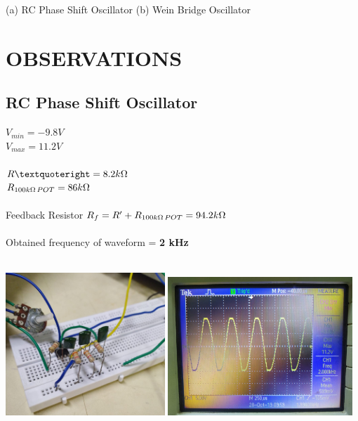 \documentclass[12pt]{report}
\begin{document}
\begin{center}
    \large (a) RC Phase Shift Oscillator\hspace{3cm} (b) Wein Bridge Oscillator
\end{center}

\chapter{OBSERVATIONS}
\label{cap:name2}

\section{RC Phase Shift Oscillator}
\Large $V_{min} = -9.8V$ \\ 
\Large $V_{max} = 11.2V$ \\ \\
\Large $R’ = 8.2 k\ohm$ \\ 
\Large $R_{100k\ohm\, POT}=86 k\ohm$ \\ \\ 
\Large \textsf{Feedback Resistor $ R_f=R'+R_{100k\ohm\, POT} =  94.2 k\ohm$}\\ \\
\Large \textsf{Obtained frequency of waveform} = \textbf{2 kHz}\\ \\

\vspace{6pt}
\begin{center}
\includegraphics[width=0.45\textwidth]{figs/RC_ps_cd.jpeg}\hspace{8pt}
\includegraphics[width=0.52\textwidth]{figs/rc_pd_oscc.jpeg}
\end{center}
\end{document}
